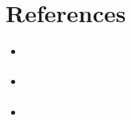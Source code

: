 \chapter{References}
\begin{itemize}
    \item \emph{\href{https://www.ibm.com/cloud/learn/three-tier-architecture}{\color{cyan}{3-tier architecture}}}
    \item \emph{\href{https://www.freecodecamp.org/news/the-model-view-controller-pattern-mvc-architecture-and-frameworks-explained/}{\color{cyan}{MVC pattern.}}}
    \item \emph{\href{https://docs.aws.amazon.com/it_it/elasticloadbalancing/latest/network/introduction.html}{\color{cyan}{Network Load Balancer}}}
\end{itemize}